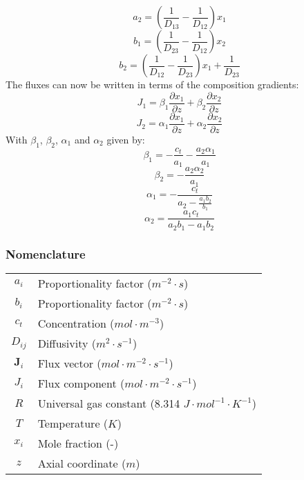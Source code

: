 \documentclass[twocolumn]{article}
\begin{document}
\begin{equation}
\label{eqn:eqn_13}
a_2 = \left( \frac{1}{D_{13}} - \frac{1}{D_{12}} \right) x_1
\end{equation}
\begin{equation}
\label{eqn:eqn_14}
b_1 = \left( \frac{1}{D_{23}} - \frac{1}{D_{12}} \right) x_2
\end{equation}
\begin{equation}
\label{eqn:eqn_15}
b_2 = \left( \frac{1}{D_{12}} - \frac{1}{D_{23}} \right) x_1 + \frac{1}{D_{23}}
\end{equation}
The fluxes can now be written in terms of the composition gradients:
\begin{equation}
\label{eqn:eqn_16}
J_1 = \beta_1 \frac{\partial x_1}{\partial z} + \beta_2 \frac{\partial x_2}{\partial z}
\end{equation}
\begin{equation}
\label{eqn:eqn_17}
J_2 = \alpha_1 \frac{\partial x_1}{\partial z} + \alpha_2 \frac{\partial x_2}{\partial z}
\end{equation}
With $\beta_1$, $\beta_2$, $\alpha_1$ and $\alpha_2$ given by:
\begin{equation}
\label{eqn:eqn_18}
\beta_1 = -\frac{c_t}{a_1} - \frac{a_2 \alpha_1}{a_1}
\end{equation}
\begin{equation}
\label{eqn:eqn_19}
\beta_2 = - \frac{a_2 \alpha_2}{a_1}
\end{equation}
\begin{equation}
\label{eqn:eqn_20}
\alpha_1 = - \frac{c_t}{a_2 - \frac{a_1 b_2}{b_1}}
\end{equation}
\begin{equation}
\label{eqn:eqn_21}
\alpha_2 = \frac{a_1 c_t}{a_2 b_1 - a_1 b_2}
\end{equation}

\subsubsection*{Nomenclature}
\begin{table}[H]
    \begin{tabular}{c l}  
      $a_i$ & Proportionality factor ($ m^{-2} \cdot s $) \\     
      $b_i$ & Proportionality factor ($ m^{-2} \cdot s $) \\     
      $c_t$ & Concentration ($mol \cdot m^{-3}$) \\
      $D_{ij}$ & Diffusivity ($m^2 \cdot s^{-1}$) \\
      $\textbf{J}_i$ & Flux vector ($mol \cdot m^{-2} \cdot s^{-1}$) \\
      $J_i$ & Flux component ($mol \cdot m^{-2} \cdot s^{-1}$) \\   
      $R$ & Universal gas constant (8.314 $J \cdot mol^{-1} \cdot K^{-1}$) \\  
      $T$ & Temperature ($K$) \\       
      $x_i$ & Mole fraction (-)\\
      $z$ & Axial coordinate ($m$) \\
    \end{tabular}
\end{table}
\end{document}
